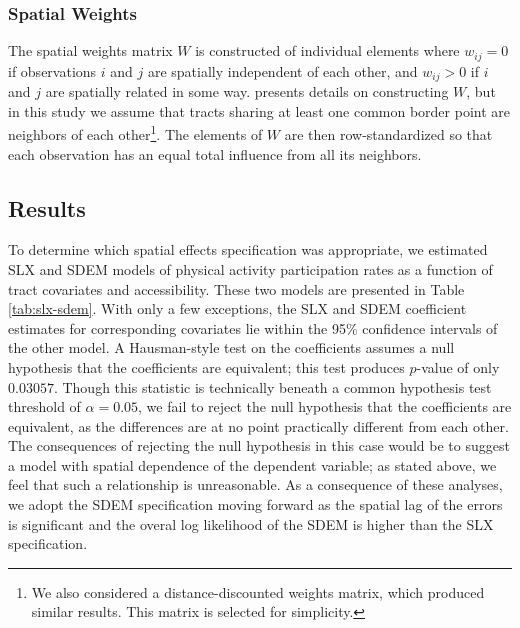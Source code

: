 \documentclass[Afour,sageh.bst]{sagej}
\begin{document}
\hypertarget{spatial-weights}{%
\subsubsection{Spatial Weights}\label{spatial-weights}}

The spatial weights matrix \(W\) is constructed of individual elements
where \(w_{ij} = 0\) if observations \(i\) and \(j\) are spatially
independent of each other, and \(w_{ij} > 0\) if \(i\) and \(j\) are
spatially related in some way. \citet{Dubin1998} presents details on
constructing \(W\), but in this study we assume that tracts sharing at
least one common border point are neighbors of each other\footnote{We
  also considered a distance-discounted weights matrix, which produced
  similar results. This matrix is selected for simplicity.}. The
elements of \(W\) are then row-standardized so that each observation has
an equal total influence from all its neighbors.

\hypertarget{results}{%
\subsection{Results}\label{results}}

To determine which spatial effects specification was appropriate, we
estimated SLX and SDEM models of physical activity participation rates
as a function of tract covariates and accessibility. These two models
are presented in Table \ref{tab:slx-sdem}. With only a few exceptions,
the SLX and SDEM coefficient estimates for corresponding covariates lie
within the 95\% confidence intervals of the other model. A Hausman-style
test \citep{Pace2008} on the coefficients assumes a null hypothesis that
the coefficients are equivalent; this test produces \(p\)-value of only
\(0.03057\). Though this statistic is technically beneath a common
hypothesis test threshold of \(\alpha = 0.05\), we fail to reject the
null hypothesis that the coefficients are equivalent, as the differences
are at no point practically different from each other. The consequences
of rejecting the null hypothesis in this case would be to suggest a
model with spatial dependence of the dependent variable; as stated
above, we feel that such a relationship is unreasonable. As a
consequence of these analyses, we adopt the SDEM specification moving
forward as the spatial lag of the errors is significant and the overal
log likelihood of the SDEM is higher than the SLX specification.
\end{document}
